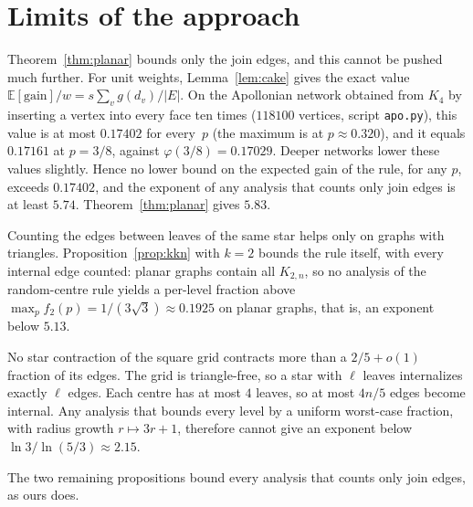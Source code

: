 \documentclass[11pt]{article}
\theoremstyle{remark}
\newcommand{\E}{\mathbb{E}}
\begin{document}
\section{Limits of the approach}\label{sec:limits}

Theorem~\ref{thm:planar} bounds only the join edges, and this cannot be pushed much further.
For unit weights, Lemma~\ref{lem:cake} gives the exact value $\E[\mathrm{gain}]/w=s\sum_vg(d_v)/|E|$.
On the Apollonian network obtained from $K_4$ by inserting a vertex into every face ten times
($118100$ vertices, script \texttt{apo.py}), this value is at most $0.17402$ for every~$p$ (the maximum is at $p\approx0.320$),
and it equals $0.17161$ at $p=3/8$, against $\varphi(3/8)=0.17029$. Deeper networks lower these
values slightly. Hence no lower bound on the expected gain of the rule, for any $p$, exceeds
$0.17402$, and the exponent of any analysis that counts only join edges is at least $5.74$.
Theorem~\ref{thm:planar} gives $5.83$.

Counting the edges between leaves of the same star helps only on graphs with triangles.
Proposition~\ref{prop:kkn} with $k=2$ bounds the rule itself, with every internal edge counted:
planar graphs contain all $K_{2,n}$, so no analysis of the random-centre rule yields a per-level
fraction above $\max_pf_2(p)=1/(3\sqrt3)\approx0.1925$ on planar graphs, that is, an exponent below
$5.13$.

No star contraction of the square grid contracts more than a $2/5+o(1)$ fraction of its
edges. The grid is triangle-free, so a star with $\ell$ leaves internalizes exactly $\ell$ edges.
Each centre has at most $4$ leaves, so at most $4n/5$ edges become internal. Any analysis that
bounds every level by a uniform worst-case fraction, with radius growth $r\mapsto3r+1$, therefore
cannot give an exponent below $\ln3/\ln(5/3)\approx2.15$.

The two remaining propositions bound every analysis that counts only join edges, as ours does.
\end{document}
